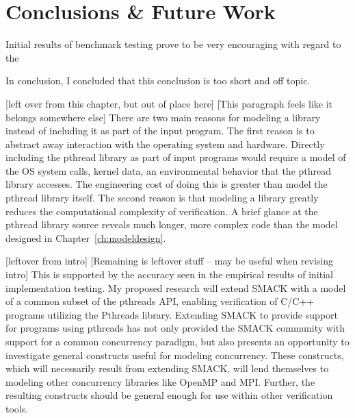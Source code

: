 \chapter{Conclusions \& Future Work}\label{ch:conclusion}
Initial results of benchmark testing prove to be very encouraging with
regard to the 







In conclusion, I concluded that this conclusion is too short and off
topic.








[left over from this chapter, but out of place here]
[This paragraph feels like it belongs somewhere else]
There are two main reasons for modeling a library instead of including
it as part of the input program.  The first reason is to abstract away
interaction with the operating system and hardware.  Directly
including the pthread library as part of input programs would require
a model of the OS system calls, kernel data, an environmental behavior
that the pthread library accesses.  The engineering cost of doing this
is greater than model the pthread library itself.  The second reason
is that modeling a library greatly reduces the computational
complexity of verification.  A brief glance at the pthread library
source reveals much longer, more complex code than the model designed
in Chapter~\ref{ch:modeldesign}.

[leftover from intro]
[Remaining is leftover stuff -- may be useful when revising intro]
This is supported by the accuracy seen in the empirical results of
initial implementation testing.  My proposed research will extend
SMACK with a model of a common subset of the pthreads API, enabling
verification of C/C++ programs utilizing the Pthreads library.
Extending SMACK to provide support for programs using pthreads has not
only provided the SMACK community with support for a common
concurrency paradigm, but also presents an opportunity to investigate
general constructs useful for modeling concurrency.  These constructs,
which will necessarily result from extending SMACK, will lend
themselves to modeling other concurrency libraries like OpenMP and
MPI.  Further, the resulting constructs should be general enough for
use within other verification tools. 



